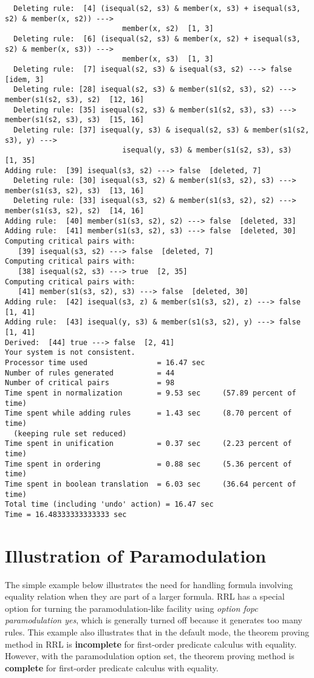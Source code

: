 \begin{verbatim}
  Deleting rule:  [4] (isequal(s2, s3) & member(x, s3) + isequal(s3, s2) & member(x, s2)) --->  
                           member(x, s2)  [1, 3]
  Deleting rule:  [6] (isequal(s2, s3) & member(x, s2) + isequal(s3, s2) & member(x, s3)) --->  
                           member(x, s3)  [1, 3]
  Deleting rule:  [7] isequal(s2, s3) & isequal(s3, s2) ---> false  [idem, 3]
  Deleting rule: [28] isequal(s2, s3) & member(s1(s2, s3), s2) ---> member(s1(s2, s3), s2)  [12, 16]
  Deleting rule: [35] isequal(s2, s3) & member(s1(s2, s3), s3) ---> member(s1(s2, s3), s3)  [15, 16]
  Deleting rule: [37] isequal(y, s3) & isequal(s2, s3) & member(s1(s2, s3), y) --->  
                           isequal(y, s3) & member(s1(s2, s3), s3)  [1, 35]
Adding rule:  [39] isequal(s3, s2) ---> false  [deleted, 7]
  Deleting rule: [30] isequal(s3, s2) & member(s1(s3, s2), s3) ---> member(s1(s3, s2), s3)  [13, 16]
  Deleting rule: [33] isequal(s3, s2) & member(s1(s3, s2), s2) ---> member(s1(s3, s2), s2)  [14, 16]
Adding rule:  [40] member(s1(s3, s2), s2) ---> false  [deleted, 33]
Adding rule:  [41] member(s1(s3, s2), s3) ---> false  [deleted, 30]
Computing critical pairs with: 
   [39] isequal(s3, s2) ---> false  [deleted, 7]
Computing critical pairs with: 
   [38] isequal(s2, s3) ---> true  [2, 35]
Computing critical pairs with: 
   [41] member(s1(s3, s2), s3) ---> false  [deleted, 30]
Adding rule:  [42] isequal(s3, z) & member(s1(s3, s2), z) ---> false  [1, 41]
Adding rule:  [43] isequal(y, s3) & member(s1(s3, s2), y) ---> false  [1, 41]
Derived:  [44] true ---> false  [2, 41]
Your system is not consistent.
Processor time used                = 16.47 sec
Number of rules generated          = 44
Number of critical pairs           = 98
Time spent in normalization        = 9.53 sec     (57.89 percent of time)
Time spent while adding rules      = 1.43 sec     (8.70 percent of time)
  (keeping rule set reduced)
Time spent in unification          = 0.37 sec     (2.23 percent of time)
Time spent in ordering             = 0.88 sec     (5.36 percent of time)
Time spent in boolean translation  = 6.03 sec     (36.64 percent of time)
Total time (including 'undo' action) = 16.47 sec
Time = 16.48333333333333 sec
\end{verbatim}
\rm
\normalsize
\vspace{0.5in}
\section{Illustration of Paramodulation}
\rm
The simple example below illustrates the need for handling formula
involving equality relation when they are part of a larger formula.
RRL has a special option for turning the paramodulation-like facility
using {\em option fopc paramodulation yes}, which is generally turned
off because it generates too many rules. This example also illustrates
that in the default mode, the theorem proving method in RRL is {\bf
incomplete} for first-order predicate calculus with equality. However,
with the paramodulation option set, the theorem proving method is {\bf
complete} for first-order predicate calculus with equality.

